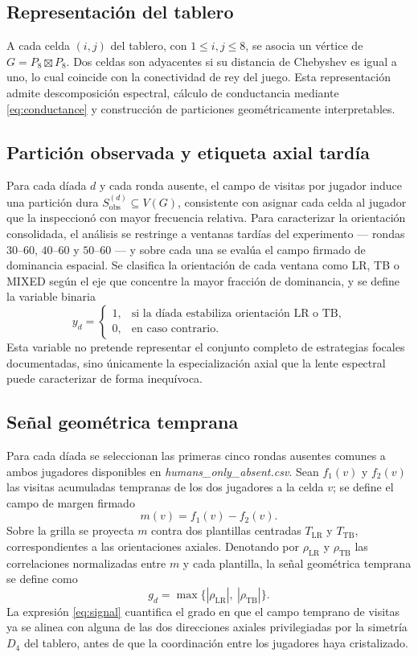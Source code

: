 \documentclass[journal]{IEEEtran}
\newcommand{\Sobs}{S_{\mathrm{obs}}}
\begin{document}
\subsection{Representación del tablero}

A cada celda $(i,j)$ del tablero, con $1 \le i,j \le 8$, se asocia un vértice de $G = P_8 \boxtimes P_8$. Dos celdas son adyacentes si su distancia de Chebyshev es igual a uno, lo cual coincide con la conectividad de rey del juego. Esta representación admite descomposición espectral, cálculo de conductancia mediante \eqref{eq:conductance} y construcción de particiones geométricamente interpretables.

\subsection{Partición observada y etiqueta axial tardía}

Para cada díada $d$ y cada ronda ausente, el campo de visitas por jugador induce una partición dura $\Sobs^{(d)}\subseteq V(G)$, consistente con asignar cada celda al jugador que la inspeccionó con mayor frecuencia relativa. Para caracterizar la orientación consolidada, el análisis se restringe a ventanas tardías del experimento --- rondas $30$--$60$, $40$--$60$ y $50$--$60$ --- y sobre cada una se evalúa el campo firmado de dominancia espacial. Se clasifica la orientación de cada ventana como LR, TB o MIXED según el eje que concentre la mayor fracción de dominancia, y se define la variable binaria
\[
y_d = \begin{cases} 1, & \text{si la díada estabiliza orientación LR o TB,}\\ 0, & \text{en caso contrario.}\end{cases}
\]
Esta variable no pretende representar el conjunto completo de estrategias focales documentadas, sino únicamente la especialización axial que la lente espectral puede caracterizar de forma inequívoca.

\subsection{Señal geométrica temprana}

Para cada díada se seleccionan las primeras cinco rondas ausentes comunes a ambos jugadores disponibles en \emph{humans\_only\_absent.csv}. Sean $f_1(v)$ y $f_2(v)$ las visitas acumuladas tempranas de los dos jugadores a la celda $v$; se define el campo de margen firmado
\[
m(v) = f_1(v) - f_2(v).
\]
Sobre la grilla se proyecta $m$ contra dos plantillas centradas $T_{\mathrm{LR}}$ y $T_{\mathrm{TB}}$, correspondientes a las orientaciones axiales. Denotando por $\rho_{\mathrm{LR}}$ y $\rho_{\mathrm{TB}}$ las correlaciones normalizadas entre $m$ y cada plantilla, la señal geométrica temprana se define como
\begin{equation}
g_d = \max\bigl\{|\rho_{\mathrm{LR}}|,\ |\rho_{\mathrm{TB}}|\bigr\}.
\label{eq:signal}
\end{equation}
La expresión \eqref{eq:signal} cuantifica el grado en que el campo temprano de visitas ya se alinea con alguna de las dos direcciones axiales privilegiadas por la simetría $D_4$ del tablero, antes de que la coordinación entre los jugadores haya cristalizado.
\end{document}
